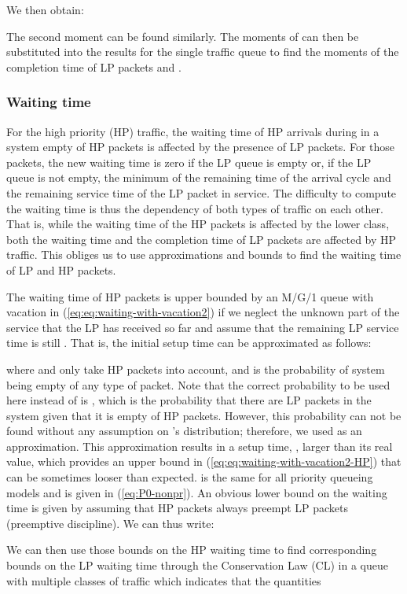 \documentclass[11pt,journal,oneside,onecolumn,draftclsnofoot]{IEEEtran}
\begin{document}
We then obtain:

The second moment can be found similarly. The moments of  can then be substituted into the results for the single traffic queue  to find the moments of the completion time of LP packets  and .


\subsubsection{Waiting time}
\label{subsec:prf-Waiting-time}
For the high priority (HP) traffic, the waiting time of HP arrivals during  in a system empty of HP packets is affected by the presence of LP packets. For those packets, the new waiting time is zero if the LP queue is empty or, if the LP queue is not empty, the minimum of the remaining time of the arrival cycle and the remaining service time of the LP packet in service. The difficulty to compute the waiting time is thus the dependency of both types of traffic on each other. That is, while the waiting time of the HP packets is affected by the lower class, both the waiting time and the completion time of LP packets are affected by HP traffic. This obliges us to use approximations and bounds to find the waiting time of LP and HP packets. 



The waiting time of HP packets is upper bounded by an M/G/1 queue with vacation in (\ref{eq:eq:waiting-with-vacation2}) if we neglect the unknown part of the service that the LP has received so far and assume that the remaining LP service time is still . That is, the initial setup time  can be approximated as follows:

where  and  only take HP packets into account, and  is the probability of system being empty of any type of packet. Note that the correct probability to be used here instead of  is , which is the probability that there are LP packets in the system given that it is empty of HP packets. However, this probability can not be found without any assumption on 's distribution; therefore, we used  as an approximation. This approximation results in a setup time, , larger than its real value, which provides an upper bound in (\ref{eq:eq:waiting-with-vacation2-HP}) that can be sometimes looser than expected.  
 is the same for all priority queueing models and is given in (\ref{eq:P0-nonpr}).
An obvious lower bound on the waiting time is given by assuming that HP packets always preempt LP packets (preemptive discipline). We can thus write:

We can then use those bounds on the HP waiting time to find corresponding bounds on the LP waiting time through the Conservation Law (CL) in a queue with multiple classes of traffic \cite{kleinrock75} which indicates that the quantities
\end{document}
